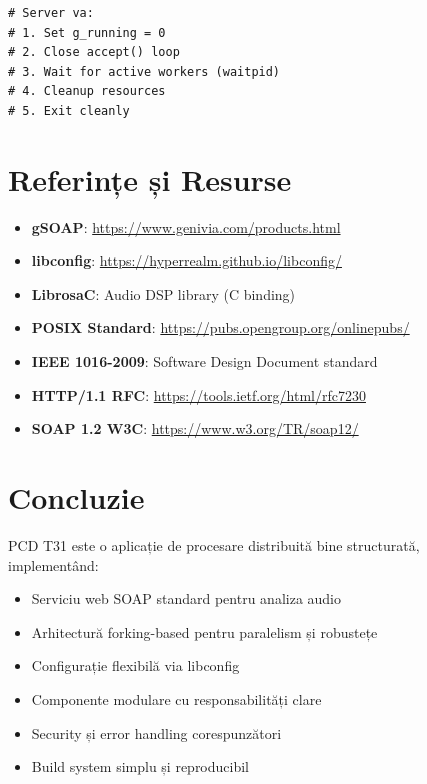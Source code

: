 \documentclass[12pt,a4paper,twoside]{article}
\begin{document}
\begin{itemize}
\begin{lstlisting}
# Server va:
# 1. Set g_running = 0
# 2. Close accept() loop
# 3. Wait for active workers (waitpid)
# 4. Cleanup resources
# 5. Exit cleanly
\end{lstlisting}

\section{Referințe și Resurse}

\begin{itemize}
    \item \textbf{gSOAP}: \url{https://www.genivia.com/products.html}
    \item \textbf{libconfig}: \url{https://hyperrealm.github.io/libconfig/}
    \item \textbf{LibrosaC}: Audio DSP library (C binding)
    \item \textbf{POSIX Standard}: \url{https://pubs.opengroup.org/onlinepubs/}
    \item \textbf{IEEE 1016-2009}: Software Design Document standard
    \item \textbf{HTTP/1.1 RFC}: \url{https://tools.ietf.org/html/rfc7230}
    \item \textbf{SOAP 1.2 W3C}: \url{https://www.w3.org/TR/soap12/}
\end{itemize}

\section{Concluzie}

PCD T31 este o aplicație de procesare distribuită bine structurată, implementând:

\begin{itemize}
    \item Serviciu web SOAP standard pentru analiza audio
    \item Arhitectură forking-based pentru paralelism și robustețe
    \item Configurație flexibilă via libconfig
    \item Componente modulare cu responsabilități clare
    \item Security și error handling corespunzători
    \item Build system simplu și reproducibil
\end{itemize}


\end{itemize}
\end{document}
